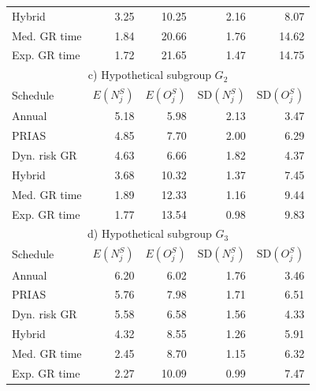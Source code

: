 \begin{table}
\begin{tabular}{lrrrr}
Hybrid       & 3.25            & 10.25               & 2.16          & 8.07              \\
Med. GR time & 1.84            & 20.66               & 1.76          & 14.62             \\
Exp. GR time & 1.72            & 21.65               & 1.47          & 14.75             \\
\hline      
\multicolumn{5}{c}{c) Hypothetical subgroup $G_2$}\\
\hline
Schedule        & $E(N^S_j)$ & $E(O^S_j)$ & ${\mbox{SD}(N^S_j)}$ & ${\mbox{SD}(O^S_j)}$ \\
\hline
Annual         & 5.18            & 5.98                & 2.13          & 3.47              \\
PRIAS          & 4.85            & 7.70                & 2.00          & 6.29        \\
Dyn. risk GR       & 4.63            & 6.66                & 1.82          & 4.37              \\
Hybrid       & 3.68            & 10.32                & 1.37          & 7.45              \\
Med. GR time & 1.89             & 12.33               & 1.16          & 9.44              \\
Exp. GR time & 1.77            & 13.54               & 0.98          & 9.83              \\
\hline      
\multicolumn{5}{c}{d) Hypothetical subgroup $G_3$}\\
\hline
Schedule        & $E(N^S_j)$ & $E(O^S_j)$ & ${\mbox{SD}(N^S_j)}$ & ${\mbox{SD}(O^S_j)}$ \\
\hline
Annual         & 6.20             & 6.02                & 1.76          & 3.46              \\
PRIAS          & 5.76             & 7.98                & 1.71         & 6.51        \\
Dyn. risk GR       & 5.58            & 6.58                & 1.56          & 4.33              \\
Hybrid       & 4.32            & 8.55                & 1.26          & 5.91              \\
Med. GR time & 2.45            & 8.70                & 1.15          & 6.32              \\
Exp. GR time & 2.27            & 10.09               & 0.99          & 7.47              \\
\hline     
\end{tabular}
\end{table}

